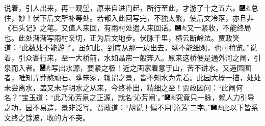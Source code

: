 说着，引人出来，再一观望，原来自进门起，所行至此，才游了十之五六。{\includegraphics[width=3mm]{../Images/00003}\includegraphics[width=3mm]{../Images/00012}\footnotesize \kaishu 总住，妙！伏下后文所补等处。若都入此回写完，不独太繁，使后文冷落，亦且非《石头记》之笔。}又值人来回，有雨村处遣人来回话。{\includegraphics[width=3mm]{../Images/00003}\includegraphics[width=3mm]{../Images/00012}\footnotesize \kaishu 又一紧收，不能终局也。此处渐渐写雨村亲切，正为后文地步。伏脉千里，横云断岭法。}贾政笑道：“此数处不能游了。虽如此，到底从那一边出去，纵不能细观，也可稍览。”说着，引众客行来，至一大桥前，水如晶帘一般奔入。原来这桥便是通外河之闸，引泉而入者。{\includegraphics[width=3mm]{../Images/00003}\includegraphics[width=3mm]{../Images/00012}\footnotesize \kaishu 写出水源，要紧之极！近之画家着意于山，苦不讲水。又造园囿者，唯知弄莽憨顽石、壅笨冢，辄谓之景，皆不知水为先着。此园大概一描，处处未尝离水，盖又未写明水之从来，今终补出，精细之至！}贾政因问：“此闸何名？”宝玉道：“此乃沁芳泉之正源，就名‘沁芳闸’。”{\includegraphics[width=3mm]{../Images/00003}\includegraphics[width=3mm]{../Images/00012}\footnotesize \kaishu 究竟只一脉，赖人力引导之功，园不易造，景非泛写。}贾政道：“胡说！偏不用‘沁芳’二字。”{\includegraphics[width=3mm]{../Images/00003}\includegraphics[width=3mm]{../Images/00012}\footnotesize \kaishu 此以下皆系文终之馀波，收的方不突。}

